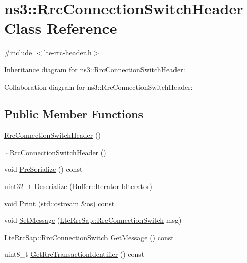 \hypertarget{classns3_1_1RrcConnectionSwitchHeader}{}\section{ns3\+:\+:Rrc\+Connection\+Switch\+Header Class Reference}
\label{classns3_1_1RrcConnectionSwitchHeader}


{\ttfamily \#include $<$lte-\/rrc-\/header.\+h$>$}



Inheritance diagram for ns3\+:\+:Rrc\+Connection\+Switch\+Header\+:


Collaboration diagram for ns3\+:\+:Rrc\+Connection\+Switch\+Header\+:
\subsection*{Public Member Functions}
\begin{DoxyCompactItemize}
\item 
\hyperlink{classns3_1_1RrcConnectionSwitchHeader_a32ab542892a8abeacad15649bd9dc3ae}{Rrc\+Connection\+Switch\+Header} ()
\item 
\hyperlink{classns3_1_1RrcConnectionSwitchHeader_abec641aa27e46dd8ccedd62cb6c0106b}{$\sim$\+Rrc\+Connection\+Switch\+Header} ()
\item 
void \hyperlink{classns3_1_1RrcConnectionSwitchHeader_a6b5c580fcbc0fb2e851cf7206f113d63}{Pre\+Serialize} () const 
\item 
uint32\+\_\+t \hyperlink{classns3_1_1RrcConnectionSwitchHeader_a9b27f43e1e87cbeb554ceb0ef818210e}{Deserialize} (\hyperlink{classns3_1_1Buffer_1_1Iterator}{Buffer\+::\+Iterator} b\+Iterator)
\item 
void \hyperlink{classns3_1_1RrcConnectionSwitchHeader_a3cf2e7843de234c68344bcaf67a6a38e}{Print} (std\+::ostream \&os) const 
\item 
void \hyperlink{classns3_1_1RrcConnectionSwitchHeader_a8f1779d756016be1cc33ff47d364a4f7}{Set\+Message} (\hyperlink{structns3_1_1LteRrcSap_1_1RrcConnectionSwitch}{Lte\+Rrc\+Sap\+::\+Rrc\+Connection\+Switch} msg)
\item 
\hyperlink{structns3_1_1LteRrcSap_1_1RrcConnectionSwitch}{Lte\+Rrc\+Sap\+::\+Rrc\+Connection\+Switch} \hyperlink{classns3_1_1RrcConnectionSwitchHeader_af538fc89be554978e0053ab4782ea5a2}{Get\+Message} () const 
\item 
uint8\+\_\+t \hyperlink{classns3_1_1RrcConnectionSwitchHeader_a2daa4a09874fde0cc49e97f77edb0822}{Get\+Rrc\+Transaction\+Identifier} () const 
\end{DoxyCompactItemize}
